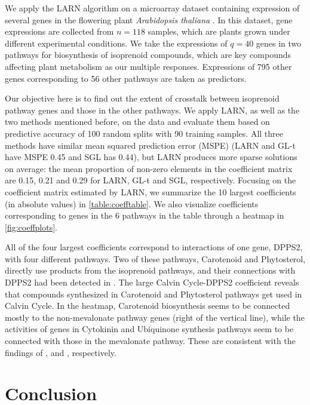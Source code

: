 We apply the LARN algorithm on a microarray dataset containing expression of several genes in the flowering plant \textit{Arabidopsis thaliana} \citep{WilleEtal04}. In this dataset, gene expressions are collected from $n=118$ samples, which are plants grown under different experimental conditions. We take the expressions of $q=40$ genes in two pathways for biosynthesis of isoprenoid compounds, which are key compounds affecting plant metabolism as our multiple responses. Expressions of 795 other genes corresponding to 56 other pathways are taken as predictors.

Our objective here is to find out the extent of crosstalk between isoprenoid pathway genes and those in the other pathways. We apply LARN, as well as the two methods mentioned before, on the data and evaluate them based on predictive accuracy of 100 random splits with 90 training samples. All three methods have similar mean squared prediction error (MSPE) (LARN and GL-t have MSPE 0.45 and SGL has 0.44), but LARN produces more sparse solutions on average: the mean proportion of non-zero elements in the coefficient matrix are 0.15, 0.21 and 0.29 for LARN, GL-t and SGL, respectively. Focusing on the coefficient matrix estimated by LARN, we summarize the 10 largest coefficients (in absolute values) in \ref{table:coefftable}. We also visualize coefficients corresponding to genes in the 6 pathways in the table through a heatmap in  \ref{fig:coeffplots}.

All of the four largest coefficients correspond to interactions of one gene, DPPS2, with four different pathways. Two of these pathways, Carotenoid and Phytosterol, directly use products from the isoprenoid pathways, and their connections with DPPS2 had been detected in \cite{WilleEtal04}. The large Calvin Cycle-DPPS2 coefficient reveals that compounds synthesized in Carotenoid and Phytosterol pathways get used in Calvin Cycle. 
In the heatmap, Carotenoid biosynthesis seems to be connected mostly to the non-mevalonate pathway genes (right of the vertical line), while the activities of genes in Cytokinin and Ubiquinone synthesis pathways seem to be connected with those in the mevalonate pathway. These are consistent with the findings of \cite{WilleEtal04}, \cite{FrebortEtal11} and \cite{Disch98}, respectively.

\section{Conclusion}

